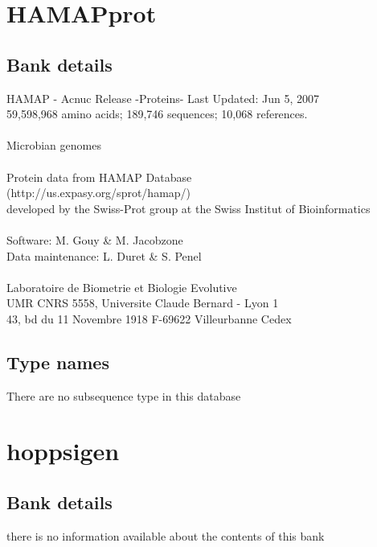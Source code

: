 \documentclass{article}
\begin{document}
\begin{Schunk}
\section{ HAMAPprot }
\subsection{Bank details}
HAMAP - Acnuc Release -Proteins- Last Updated: Jun  5, 2007\\
59,598,968 amino acids; 189,746 sequences; 10,068 references.\\
\\
Microbian genomes\\
\\
Protein data from  HAMAP Database\\
(http://us.expasy.org/sprot/hamap/)\\
developed by the Swiss-Prot group at the Swiss Institut of Bioinformatics\\
\\
Software: M. Gouy \& M. Jacobzone\\
Data maintenance: L. Duret \& S. Penel\\
\\
Laboratoire de Biometrie et Biologie Evolutive\\
UMR CNRS 5558, Universite Claude Bernard - Lyon 1\\
43, bd du 11 Novembre 1918 F-69622 Villeurbanne Cedex\\


\subsection{Type names}
There are no subsequence type in this database
\section{ hoppsigen }
\subsection{Bank details}
there is no information available about the contents of this bank


\end{Schunk}
\end{document}

